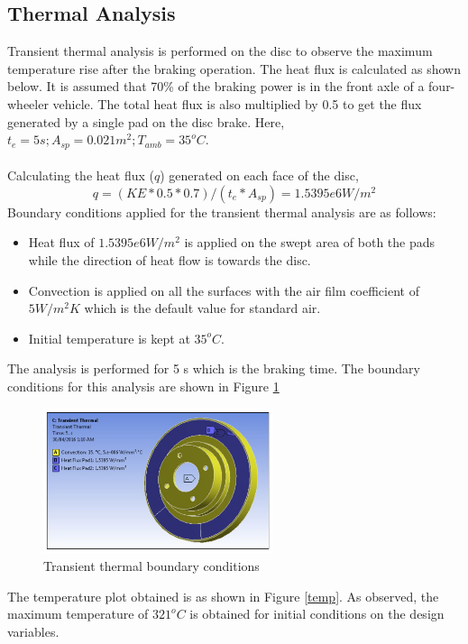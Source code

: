 \documentclass[12pt]{article}
\begin{document}
\subsection{Thermal Analysis}
Transient thermal analysis is performed on the disc to observe the maximum temperature rise after the braking operation. The heat flux is calculated as shown below. It is assumed that 70\% of the braking power is in the front axle of a four-wheeler vehicle. The total heat flux is also multiplied by 0.5 to get the flux generated by a single pad on the disc brake. Here, $t_{e} = 5 s; A_{sp} = 0.021 m^{2}; T_{amb} = 35^{o}C.$
\\\\Calculating the heat flux ($q$) generated on each face of the disc,
\begin{equation}
q = (KE*0.5*0.7)/(t_{e}*A_{sp}) = 1.5395e6 W/m^{2}
\end{equation}
Boundary conditions applied for the transient thermal analysis are as follows:
\begin{itemize}
\item Heat flux of $1.5395e6 W/m^{2}$ is applied on the swept area of both the pads while the direction of heat flow is towards the disc.
\item Convection is applied on all the surfaces with the air film coefficient of $5 W/m^{2}K$ which is the default value for standard air.
\item Initial temperature is kept at $35^{o}C$.
\end{itemize}
The analysis is performed for 5 s which is the braking time. The boundary conditions for this analysis are shown in Figure \ref{bc1}
\begin{figure}[H]
\begin{center}
\includegraphics[width=0.6\textwidth]{bc1.jpg}
\caption{Transient thermal boundary conditions}
\label{bc1}
\end{center}
\end{figure}
The temperature plot obtained is as shown in Figure \ref{temp}. As observed, the maximum temperature of $321^{o}C$ is obtained for initial conditions on the design variables.
\end{document}
